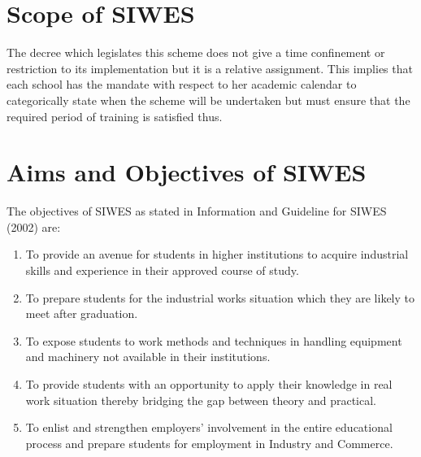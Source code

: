 \section{Scope of SIWES}


The decree which legislates this scheme does not give a time confinement or restriction to
its implementation but it is a relative assignment. This implies that each school has the mandate
with respect to her academic calendar to categorically state when the scheme will be undertaken but must ensure that the required period of training is satisfied thus. 
\section{Aims and Objectives of SIWES}


The objectives of SIWES as stated in Information and Guideline for \ac{SIWES} (2002) are:
\begin{enumerate}
	\item To provide an avenue for students in higher institutions to acquire industrial skills and experience in their approved course of study.
	\item To prepare students for the industrial works situation which they are likely to meet after graduation.
	\item To expose students to work methods and techniques in handling equipment and machinery
	not available in their institutions.

	\item To provide students with an opportunity to apply their knowledge in real work situation
	thereby bridging the gap between theory and practical.
	\item To enlist and strengthen employers’ involvement in the entire educational process and
	prepare students for employment in Industry and Commerce.
\end{enumerate}
